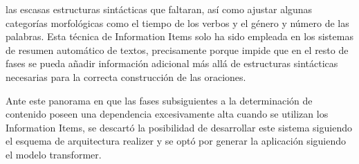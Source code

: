 las escasas estructuras sintácticas que faltaran, así como ajustar algunas categorías morfológicas como el tiempo de los verbos y el género y número de las palabras. Esta técnica de Information Items solo ha sido empleada en los sistemas de resumen automático de textos, precisamente porque impide que en el resto de fases se pueda añadir información adicional más allá de estructuras sintácticas necesarias para la correcta construcción de las oraciones.

Ante este panorama en que las fases subsiguientes a la determinación de contenido poseen una dependencia excesivamente alta cuando se utilizan los Information Items, se descartó la posibilidad de desarrollar este sistema siguiendo el esquema de arquitectura realizer y se optó por generar la aplicación siguiendo el modelo transformer.